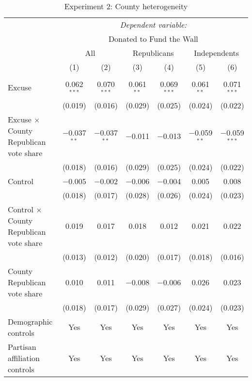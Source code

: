 
\begin{table}[!htbp] \centering 
  \caption{Experiment 2: County heterogeneity} 
  \label{t:2-cityheterogeneity} 
\begin{threeparttable}
\begin{tabular}{@{\hspace{5pt}}l@{\hspace{5pt}}cccccc} 
\toprule 
 & \multicolumn{6}{c}{\textit{Dependent variable:}} \\ 
\cmidrule(rr){2-7} 
 & \multicolumn{6}{c}{Donated to Fund the Wall} \\ 
 \cmidrule(rr){2-7}
 & \multicolumn{2}{c}{All} & \multicolumn{2}{c}{Republicans} & \multicolumn{2}{c}{Independents} \\ 
 & (1) & (2) & (3) & (4) & (5) & (6)\\ 
\midrule  
\\[-2.1ex] Excuse & 0.062$^{***}$ & 0.070$^{***}$ & 0.061$^{**}$ & 0.069$^{***}$ & 0.061$^{**}$ & 0.071$^{***}$ \\ 
  & (0.019) & (0.016) & (0.029) & (0.025) & (0.024) & (0.022) \\ 
 \addlinespace 
 Excuse $\times$ County Republican vote share & $-$0.037$^{**}$ & $-$0.037$^{**}$ & $-$0.011 & $-$0.013 & $-$0.059$^{**}$ & $-$0.059$^{***}$ \\ 
  & (0.018) & (0.016) & (0.029) & (0.025) & (0.024) & (0.022) \\ 
 \addlinespace 
 Control & $-$0.005 & $-$0.002 & $-$0.006 & $-$0.004 & 0.005 & 0.008 \\ 
  & (0.018) & (0.017) & (0.028) & (0.026) & (0.024) & (0.023) \\ 
 \addlinespace 
 Control $\times$ County Republican vote share & 0.019 & 0.017 & 0.018 & 0.012 & 0.021 & 0.022 \\ 
  & (0.013) & (0.012) & (0.020) & (0.017) & (0.018) & (0.016) \\ 
 \addlinespace 
 County Republican vote share & 0.010 & 0.011 & $-$0.008 & $-$0.006 & 0.026 & 0.023 \\ 
  & (0.018) & (0.017) & (0.029) & (0.027) & (0.024) & (0.023) \\ 
 \addlinespace 
\midrule  
Demographic controls & Yes & Yes & Yes & Yes & Yes & Yes \\ 
Partisan affiliation controls & Yes & Yes & Yes & Yes & Yes & Yes \\ 

\end{tabular}
\end{threeparttable}
\end{table}
